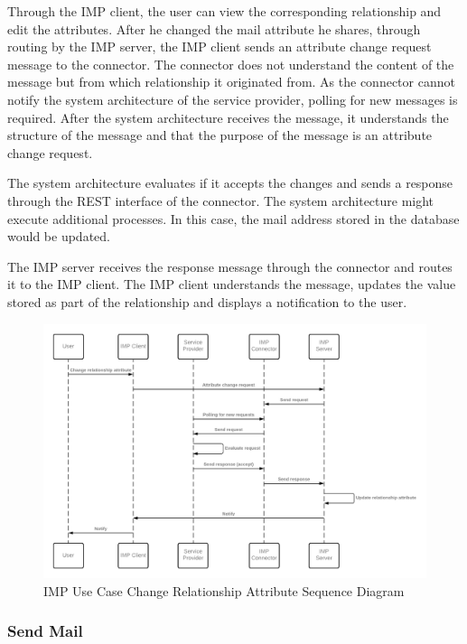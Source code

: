 Through the IMP client, the user can view the corresponding relationship and edit the attributes. After he changed the mail attribute he shares, through routing by the IMP server, the IMP client sends an attribute change request message to the connector. The connector does not understand the content of the message but from which relationship it originated from. As the connector cannot notify the system architecture of the service provider, polling for new messages is required. After the system architecture receives the message, it understands the structure of the message and that the purpose of the message is an attribute change request.

The system architecture evaluates if it accepts the changes and sends a response through the REST interface of the connector. The system architecture might execute additional processes. In this case, the mail address stored in the database would be updated.

The IMP server receives the response message through the connector and routes it to the IMP client. The IMP client understands the message, updates the value stored as part of the relationship and displays a notification to the user.

\begin{figure}[h]
    \centering
    \caption{IMP Use Case Change Relationship Attribute Sequence Diagram}
    \includegraphics[scale=0.3]{Diagrams/IMP Use Case Change Realtionship Attribute Sequence Diagram.png}
\end{figure}

\subsubsection{Send Mail}

